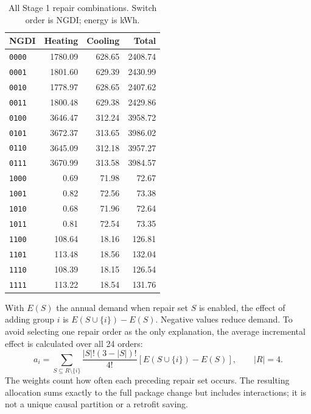 \begin{table}[H]\centering\small
\caption{All Stage 1 repair combinations. Switch order is NGDI; energy is kWh.}\label{tab:stage1all}
\begin{tabular}{@{}lrrr@{}}\toprule
NGDI & Heating & Cooling & Total\\\midrule
\nolinkurl{0000} & 1780.09 & 628.65 & 2408.74 \\
\nolinkurl{0001} & 1801.60 & 629.39 & 2430.99 \\
\nolinkurl{0010} & 1778.97 & 628.65 & 2407.62 \\
\nolinkurl{0011} & 1800.48 & 629.38 & 2429.86 \\
\nolinkurl{0100} & 3646.47 & 312.24 & 3958.72 \\
\nolinkurl{0101} & 3672.37 & 313.65 & 3986.02 \\
\nolinkurl{0110} & 3645.09 & 312.18 & 3957.27 \\
\nolinkurl{0111} & 3670.99 & 313.58 & 3984.57 \\
\nolinkurl{1000} & 0.69 & 71.98 & 72.67 \\
\nolinkurl{1001} & 0.82 & 72.56 & 73.38 \\
\nolinkurl{1010} & 0.68 & 71.96 & 72.64 \\
\nolinkurl{1011} & 0.81 & 72.54 & 73.35 \\
\nolinkurl{1100} & 108.64 & 18.16 & 126.81 \\
\nolinkurl{1101} & 113.48 & 18.56 & 132.04 \\
\nolinkurl{1110} & 108.39 & 18.15 & 126.54 \\
\nolinkurl{1111} & 113.22 & 18.54 & 131.76 \\
\bottomrule\end{tabular}\end{table}

With $E(S)$ the annual demand when repair set $S$ is enabled, the effect of adding group $i$ is $E(S\cup\{i\})-E(S)$. Negative values reduce demand. To avoid selecting one repair order as the only explanation, the average incremental effect is calculated over all 24 orders:
\begin{equation}
a_i=\sum_{S\subseteq R\setminus\{i\}}
\frac{|S|!(3-|S|)!}{4!}\left[E(S\cup\{i\})-E(S)\right],\qquad |R|=4.
\end{equation}
The weights count how often each preceding repair set occurs. The resulting allocation sums exactly to the full package change but includes interactions; it is not a unique causal partition or a retrofit saving.

